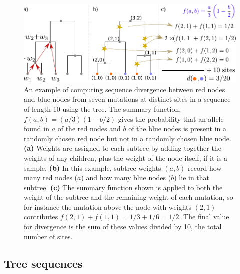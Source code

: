\documentclass{article}
\begin{document}
\begin{figure}
    \centering
    \includegraphics{figures/divergence_diagram}
    \caption{
        An example of computing sequence divergence between red nodes and blue nodes
        from seven mutations at distinct sites in a sequence of length 10 using the tree.
        The summary function, $f(a,b) = (a/3)(1-b/2)$ gives the probability that
        an allele found in $a$ of the red nodes and $b$ of the blue nodes is present in
        a randomly chosen red node but not in a randomly chosen blue node.
        \textbf{(a)} Weights are assigned to each subtree by adding together the weights of any children,
        plus the weight of the node itself, if it is a sample.
        \textbf{(b)} In this example, subtree weights $(a,b)$ record how many red nodes ($a$)
        and how many blue nodes ($b$) lie in that subtree.
        \textbf{(c)} The summary function shown is applied to both the weight of the subtree
        and the remaining weight of each mutation,
        so for instance the mutation above the node with weights $(2,1)$
        contributes $f(2,1) + f(1,1) = 1/3 + 1/6 = 1/2$.
        The final value for divergence is the sum of these values divided by 10,
        the total number of sites.
        \label{fig:divergence_diagram}
    }
\end{figure}


\subsection*{Tree sequences}
\end{document}
